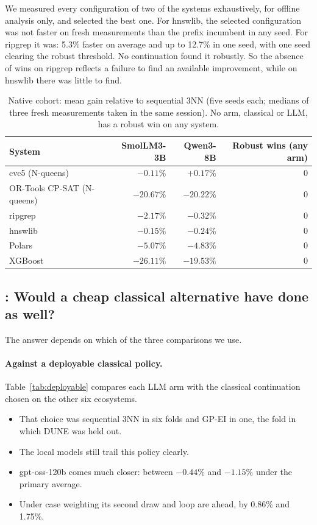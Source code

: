 We measured every configuration of two of the systems exhaustively, for offline analysis only, and selected the best one. For hnswlib, the selected configuration was not faster on fresh measurements than the prefix incumbent in any seed. For ripgrep it was: 5.3\% faster on average and up to 12.7\% in one seed, with one seed clearing the robust threshold. No continuation found it robustly. So the absence of wins on ripgrep reflects a failure to find an available improvement, while on hnswlib there was little to find.

\begin{table}[t]
\centering
\caption{Native cohort: mean gain relative to sequential 3NN (five seeds each; medians of three fresh measurements taken in the same session). No arm, classical or LLM, has a robust win on any system.}
\label{tab:native}
\small
\begin{tabular}{lrrr}
\toprule
System & SmolLM3-3B & Qwen3-8B & Robust wins (any arm) \\
\midrule
cvc5 (N-queens) & $-0.11\%$ & $+0.17\%$ & 0 \\
OR-Tools CP-SAT (N-queens) & $-20.67\%$ & $-20.22\%$ & 0 \\
ripgrep & $-2.17\%$ & $-0.32\%$ & 0 \\
hnswlib & $-0.15\%$ & $-0.24\%$ & 0 \\
Polars & $-5.07\%$ & $-4.83\%$ & 0 \\
XGBoost & $-26.11\%$ & $-19.53\%$ & 0 \\
\bottomrule
\end{tabular}
\end{table}

\subsection{: Would a cheap classical alternative have done as well?}
\label{sec:rq2}

The answer depends on which of the three comparisons we use.

\paragraph{Against a deployable classical policy.} Table~\ref{tab:deployable} compares each LLM arm with the classical continuation chosen on the other six ecosystems.
\begin{itemize}
  \item That choice was sequential 3NN in six folds and GP-EI in one, the fold in which DUNE was held out.
  \item The local models still trail this policy clearly.
  \item gpt-oss-120b comes much closer: between $-0.44\%$ and $-1.15\%$ under the primary average.
  \item Under case weighting its second draw and loop are ahead, by 0.86\% and 1.75\%.
\end{itemize}

